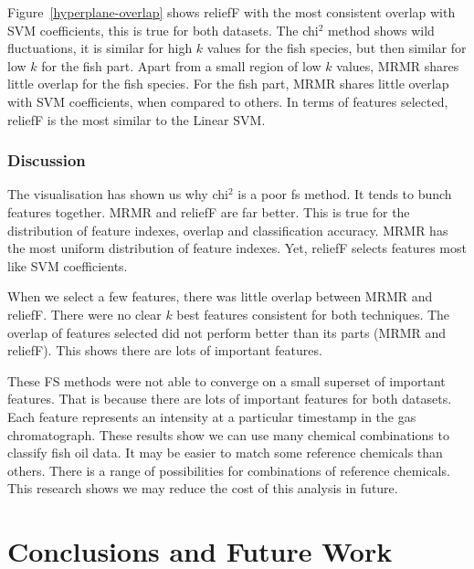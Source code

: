 \documentclass[runningheads]{llncs}
\begin{document}
Figure~\ref{hyperplane-overlap} shows reliefF with the most consistent overlap with SVM coefficients, this is true for both datasets.
The chi$^2$ method shows wild fluctuations, it is similar for high $k$ values for the fish species, but then similar for low $k$ for the fish part.
Apart from a small region of low $k$ values, MRMR shares little overlap for the fish species.
For the fish part, MRMR shares little overlap with SVM coefficients, when compared to others.
In terms of features selected, reliefF is the most similar to the Linear SVM.

\subsubsection{Discussion}
\label{sec:visualisation-discussion}

The visualisation has shown us why chi$^2$ is a poor fs method.
It tends to bunch features together.
MRMR and reliefF are far better.
This is true for the distribution of feature indexes, overlap and classification accuracy.
MRMR has the most uniform distribution of feature indexes.
Yet, reliefF selects features most like SVM coefficients.

When we select a few features, there was little overlap between MRMR and reliefF.
There were no clear $k$ best features consistent for both techniques.
The overlap of features selected did not perform better than its parts (MRMR and reliefF).
This shows there are lots of important features.

These FS methods were not able to converge on a small superset of important features.
That is because there are lots of important features for both datasets.
Each feature represents an intensity at a particular timestamp in the gas chromatograph.
These results show we can use many chemical combinations to classify fish oil data.
It may be easier to match some reference chemicals than others.
There is a range of possibilities for combinations of reference chemicals.
This research shows we may reduce the cost of this analysis in future.


\section{Conclusions and Future Work}

\end{document}

